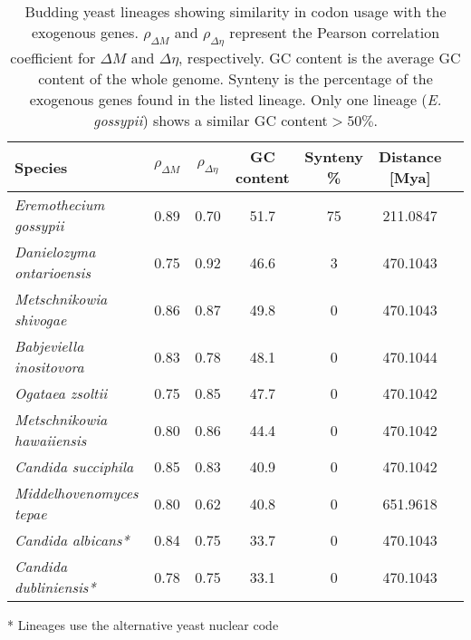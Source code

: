 \documentclass{bmcart}
\newcommand{\gossypii}{\textit{E. gossypii}\xspace}
\newcommand{\GC}{GC content\xspace}
\newcommand{\DM}{\ensuremath{{\Delta M}}\xspace}
\newcommand{\DE}{\ensuremath{{\Delta \eta}}\xspace}
\begin{document}
\begin{table}
  \centering
  \caption{Budding yeast lineages showing similarity in codon usage with the exogenous genes.
  $\rho_\DM$ and $\rho_\DE$ represent the Pearson correlation coefficient for \DM and \DE, respectively.
  \GC is the average \GC of the whole genome.
  Synteny is the percentage of the exogenous genes found in the listed lineage.
  Only one lineage (\gossypii) shows a similar \GC $> 50 \%$.}
  \begin{threeparttable}
  	\begin{tabular}{lcccccc}
    		\hline
    		Species & $\rho_\DM$ & $\rho_\DE$ & \GC & Synteny \%&  Distance [Mya] \\ \hline 
    		\emph{Eremothecium gossypii}			& 0.89 & 0.70 & 51.7 & 75 & 211.0847 \\
    		\emph{Danielozyma ontarioensis}			& 0.75 & 0.92 & 46.6 & 3   & 470.1043 \\
    		\emph{Metschnikowia shivogae}			& 0.86 & 0.87 & 49.8 & 0   & 470.1043 \\
    		\emph{Babjeviella inositovora}			& 0.83 & 0.78 & 48.1 & 0   & 470.1044 \\
    		\emph{Ogataea zsoltii}					& 0.75 & 0.85 & 47.7 & 0   & 470.1042 \\ 
    		\emph{Metschnikowia hawaiiensis}		& 0.80 & 0.86 & 44.4 & 0   & 470.1042 \\
    		\emph{Candida succiphila}	       			& 0.85 & 0.83 & 40.9 & 0   & 470.1042 \\ 
    		\emph{Middelhovenomyces tepae}		& 0.80 & 0.62 & 40.8 & 0   & 651.9618 \\ 
    		\emph{Candida albicans*}		   		& 0.84 & 0.75 & 33.7 & 0   & 470.1043 \\
   		\emph{Candida dubliniensis*}               		& 0.78 & 0.75 & 33.1 & 0   & 470.1043 \\ \hline
  	\end{tabular}
  	\begin{tablenotes}
    		\item[*] Lineages use the alternative yeast nuclear code %
 	 \end{tablenotes}
  \end{threeparttable}  
  \label{tab:source}
\end{table}
\end{document}
